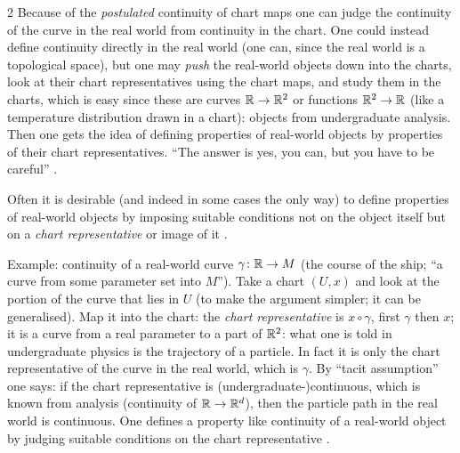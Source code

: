 \begin{paracol}{2}
Because of the \emph{postulated} continuity of chart maps one can judge the continuity of the curve in the real world from continuity in the chart. One could instead define continuity directly in the real world (one can, since the real world is a topological space), but one may \emph{push} the real-world objects down into the charts,
look at their chart representatives using the chart maps, and study them in the charts, which is easy since these are curves $\mathbb{R}\to\mathbb{R}^2$ or functions $\mathbb{R}^2\to\mathbb{R}$ (like a temperature distribution drawn in a chart): objects from undergraduate analysis. Then one gets the idea of defining properties of real-world objects by
properties of their chart representatives. ``The answer is yes, you can, but you have to be careful'' .

\begin{remark}\label{rem:c02-philosophy}
Often it is desirable (and indeed in some cases the only way) to define properties of real-world objects by imposing suitable conditions not on the object itself but on a \emph{chart representative} or image of it
.
\end{remark}
Example: continuity of a real-world curve $\gamma\colon\mathbb{R}\to M$ (the course of the ship; ``a curve from some parameter set into $M$''). Take a chart $(U,x)$ and look at the portion of the curve that lies in $U$ (to make the argument simpler; it can be generalised).
Map it into the chart: the \emph{chart representative} is $x\circ\gamma$, first $\gamma$ then $x$; it is a curve from a real parameter to a part of $\mathbb{R}^2$: what one is told in undergraduate physics is the trajectory of a particle. In fact it is only the chart representative of
the curve in the real world, which is $\gamma$. By ``tacit assumption'' one says: if the chart representative is (undergraduate-)continuous, which is known from analysis (continuity of $\mathbb{R}\to\mathbb{R}^d$), then the particle path in the real world is continuous.
One defines a property like continuity of a real-world object by judging suitable conditions on the chart representative .


\end{paracol}

